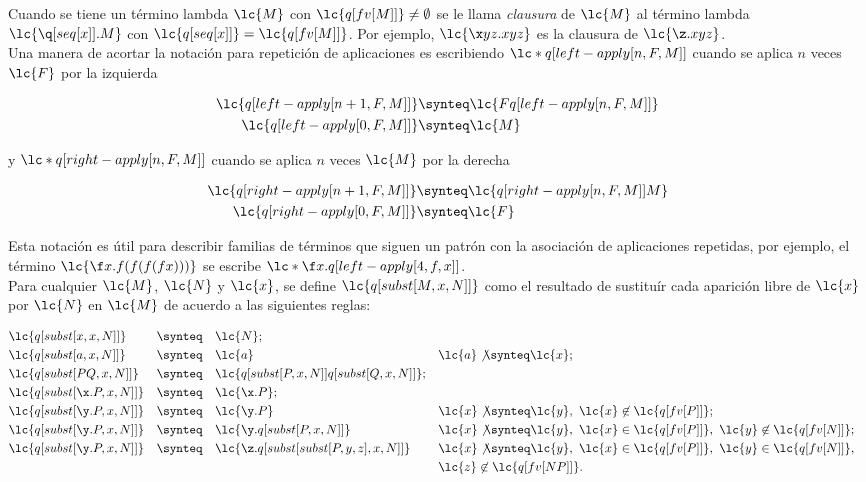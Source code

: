 Cuando se tiene un término lambda \(\lc{M}\) con \(\lc{q[fv[M]]} \not=
\emptyset\) se le llama \emph{clausura} de \(\lc{M}\) al término lambda
\(\lc{\q[seq[x]].M}\) con \(\lc{q[seq[x]]}=\lc{q[fv[M]]}\). Por ejemplo,
\(\lc{\x y z.x y z}\) es la clausura de \(\lc{\z.x y z}\). \\

Una manera de acortar la notación para repetición de aplicaciones es escribiendo
\(\lc*{q[left-apply[n,F,M]]}\) cuando se aplica \(n\) veces \(\lc{F}\) por la
izquierda

\begin{align*}
  \lc{q[left-apply[n+1,F,M]]} &\synteq \lc{F q[left-apply[n,F,M]]}\\
  \lc{q[left-apply[0,F,M]]}   &\synteq \lc{M}
\end{align*}

y \(\lc*{q[right-apply[n,F,M]]}\) cuando se aplica \(n\) veces \(\lc{M}\) por la
derecha

\begin{align*}
  \lc{q[right-apply[n+1,F,M]]} &\synteq \lc{q[right-apply[n,F,M]] M}\\
  \lc{q[right-apply[0,F,M]]}   &\synteq \lc{F}
\end{align*}

Esta notación es útil para describir familias de términos que siguen un patrón
con la asociación de aplicaciones repetidas, por ejemplo, el término \(\lc{\f
  x.f(f(f(f x)))}\) se escribe \(\lc*{\f x.q[left-apply[4,f,x]]}\). \\

Para cualquier \(\lc{M}\), \(\lc{N}\) y \(\lc{x}\), se define
\(\lc{q[subst[M,x,N]]}\) como el resultado de sustituír cada aparición libre de
\(\lc{x}\) por \(\lc{N}\) en \(\lc{M}\) de acuerdo a las siguientes reglas:

\begin{align*}
  &\lc{q[subst[x,x,N]]} & &\synteq & &\lc{N}; \\
  &\lc{q[subst[a,x,N]]} & &\synteq & &\lc{a} & &\lc{a} \not\synteq \lc{x}; \\
  &\lc{q[subst[P Q,x,N]]} & &\synteq & &\lc{q[subst[P,x,N]] q[subst[Q,x,N]]}; \\
  &\lc{q[subst[\x.P,x,N]]} & &\synteq & &\lc{\x.P}; \\
  &\lc{q[subst[\y.P,x,N]]} & &\synteq & &\lc{\y.P} & &\lc{x}\not\synteq \lc{y},\ \lc{x} \not\in \lc{q[fv[P]]}; \\
  &\lc{q[subst[\y.P,x,N]]} & &\synteq & &\lc{\y.q[subst[P,x,N]]} & &\lc{x}\not\synteq \lc{y},\ \lc{x}\in\lc{q[fv[P]]},\ \lc{y}\not\in \lc{q[fv[N]]}; \\
  &\lc{q[subst[\y.P,x,N]]} & &\synteq & &\lc{\z.q[subst[subst[P,y,z],x,N]]} & &\lc{x}\not\synteq \lc{y},\ \lc{x}\in\lc{q[fv[P]]},\ \lc{y}\in \lc{q[fv[N]]}, \\
  & & & & & & & \lc{z}\not\in \lc{q[fv[N P]]}.
\end{align*}

